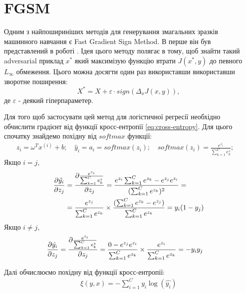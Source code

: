 \documentclass[a4paper,12pt]{extreport}
\newcommand{\tran}{^{T}}
\newcommand{\ith}{^{(i)}}
\begin{document}
	\section{FGSM}
	Одним з найпошириніших методів для генерування змагальних зразків машинного навчання є Fast Gradient Sign Method. В перше він був представлений в роботі \textcite{goodfellow2014explaining}. Ідея цього методу полягає в тому, щоб знайти такий adversarial приклад $x^{*}$ який максимізую функцію втрати $J(x^{*}, y)$ до певного $L_{\infty}$ обмеження. Цього можна досягти один раз використавши використавши зворотне поширення:
	\begin{equation}
	X^{*} = X + \varepsilon \cdot sign(\Delta_x J(x, y)),
	\end{equation}
	де $\varepsilon$ - деякий гіперпараметер.
	
	Для того щоб застосувати цей метод для логістичної регресії необхідно обчислити градієнт від функції кросс-ентропії \ref{eq:cross-entropy}. Для цього спочатку знайдемо похідну від $softmax$ функції:
	\begin{align*}
		z_i = \omega\tran x\ith + b; \quad
		\hat{y}_i = a_i = softmax(z_i); \quad
		softmax(z_i) = \frac{e^{z_i}}{\sum_{k=1}^{C} e_k^z}; \quad
	\end{align*}
	Якщо $i = j$,
	\begin{align}
	    \pdv{\hat{y_i}}{z_j} 
	    &=
	    \pdv{\frac{e^{z_i}}{\sum_{k=1}^{C} e_k^z}}{z_j} 
	    =
	    \frac{e^{z_i} \sum_{k=1}^{C} e^{z_k} - e^{z_j} e^{z_i}}{(\sum_{k=1}^{C}  e^{z_k})^2} 
	    = \\& =
	    \frac{e^{z_j}}{\sum_{k=1}^{C}  e^{z_k}} \times \frac{(\sum_{k=1}^{C} e^{z_k} - e^{z_j})}{\sum_{k=1}^{C}  e^{z_k}} 
	    = 
	    y_i(1-y_j)
	\end{align}
	Якщо $i \neq j$,
	\begin{align}
		\pdv{\hat{y_i}}{z_j}
		&=
		\pdv{\frac{e^{z_i}}{\sum_{k=1}^{C} e_k^z}}{z_j} 
		=
		\frac{0 - e^{z_j} e^{z_i}}{\sum_{k=1}^{C}  e^{z_k}} \times \frac{e^{z_i}}{\sum_{k=1}^{C} e^{z_k}} 
		= 
		-y_i y_j 
	\end{align}
	
	\begingroup
	\setlength{\abovedisplayskip}{0pt}
	\setlength{\belowdisplayskip}{0pt}
	
	Далі обчислюємо похідну від функції кросс-ентропії:
	\begin{align*}
		\xi(y, x) = - \sum_{i=1}^{C} y_i  \log (\hat{y_i})
	\end{align*}
\end{document}
